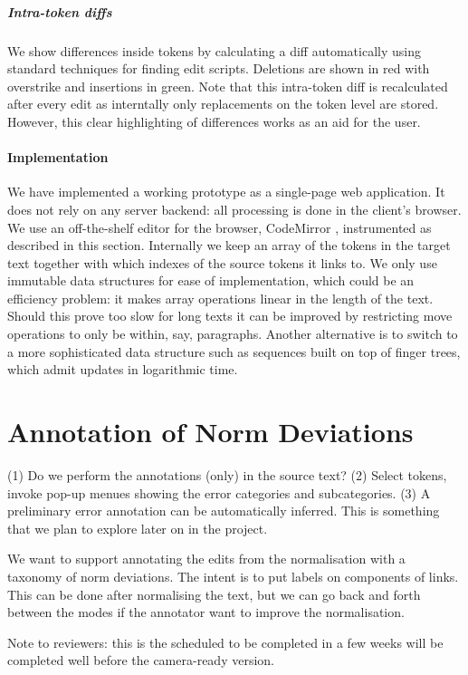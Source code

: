 \documentclass[10pt, a4paper]{article}
\begin{document}
\subparagraph{Intra-token diffs} We show differences inside tokens by
calculating a diff automatically using standard techniques for finding
edit scripts.  Deletions are shown in red with overstrike and insertions
in green.  Note that this intra-token diff is recalculated after every edit
as interntally only replacements on the token level are stored.  However,
this clear highlighting of differences works as an aid for the user.

\paragraph{Implementation}
We have implemented a working prototype as a single-page web application.
It does not rely on any server backend: all processing is done in the
client's browser. We use an off-the-shelf editor for the browser,
CodeMirror \cite{CodeMirror},
instrumented as described in this section.
Internally we keep an array of the tokens in the target text together with
which indexes of the source tokens it links to.  We only use immutable data
structures for ease of implementation,  which could be an efficiency problem:
it makes array operations linear in the length of the text. Should
this prove too slow for long texts it can be improved by restricting move
operations to only be within, say, paragraphs. Another alternative is to
switch to a more sophisticated data structure such as sequences built on
top of finger trees, which admit updates in logarithmic time.

\section{Annotation of Norm Deviations}
\label{sec:ann_tool}

(1) Do we perform the annotations (only) in the source text? (2) Select tokens, invoke pop-up menues showing the error categories and subcategories. (3) A preliminary error annotation can be automatically inferred. This is something that we plan to explore later on in the project.

We want to support annotating the edits from the normalisation with a taxonomy
of norm deviations.  The intent is to put labels on components of links.
This can be done after normalising the text, but we can go back and forth
between the modes if the annotator want to improve the normalisation.

Note to reviewers: this is the scheduled to be completed in a few weeks
will be completed well before the camera-ready version.
%
\end{document}
